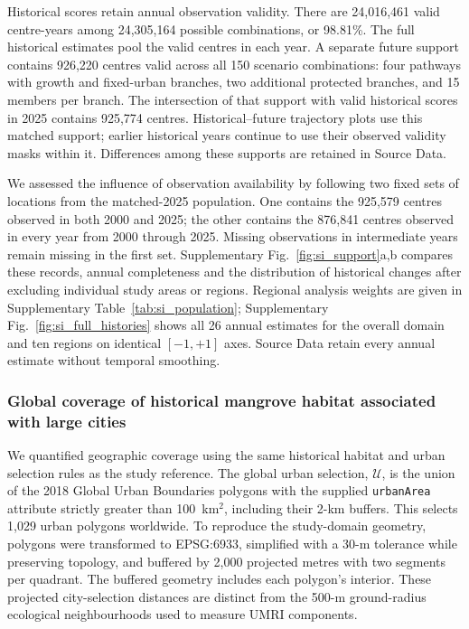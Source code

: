 Historical scores retain annual observation validity. There are 24,016,461 valid centre-years among 24,305,164 possible combinations, or 98.81\%. The full historical estimates pool the valid centres in each year. A separate future support contains 926,220 centres valid across all 150 scenario combinations: four pathways with growth and fixed-urban branches, two additional protected branches, and 15 members per branch. The intersection of that support with valid historical scores in 2025 contains 925,774 centres. Historical--future trajectory plots use this matched support; earlier historical years continue to use their observed validity masks within it. Differences among these supports are retained in Source Data.

We assessed the influence of observation availability by following two fixed sets of locations from the matched-2025 population. One contains the 925,579 centres observed in both 2000 and 2025; the other contains the 876,841 centres observed in every year from 2000 through 2025. Missing observations in intermediate years remain missing in the first set. Supplementary Fig.~\ref{fig:si_support}a,b compares these records, annual completeness and the distribution of historical changes after excluding individual study areas or regions. Regional analysis weights are given in Supplementary Table~\ref{tab:si_population}; Supplementary Fig.~\ref{fig:si_full_histories} shows all 26 annual estimates for the overall domain and ten regions on identical $[-1,+1]$ axes. Source Data retain every annual estimate without temporal smoothing.




\subsubsection{Global coverage of historical mangrove habitat associated with large cities}
We quantified geographic coverage using the same historical habitat and urban selection rules as the study reference. The global urban selection, $\mathcal U$, is the union of the 2018 Global Urban Boundaries polygons with the supplied \texttt{urbanArea} attribute strictly greater than 100~km$^2$, including their 2-km buffers. This selects 1,029 urban polygons worldwide. To reproduce the study-domain geometry, polygons were transformed to EPSG:6933, simplified with a 30-m tolerance while preserving topology, and buffered by 2,000 projected metres with two segments per quadrant. The buffered geometry includes each polygon's interior. These projected city-selection distances are distinct from the 500-m ground-radius ecological neighbourhoods used to measure UMRI components.

